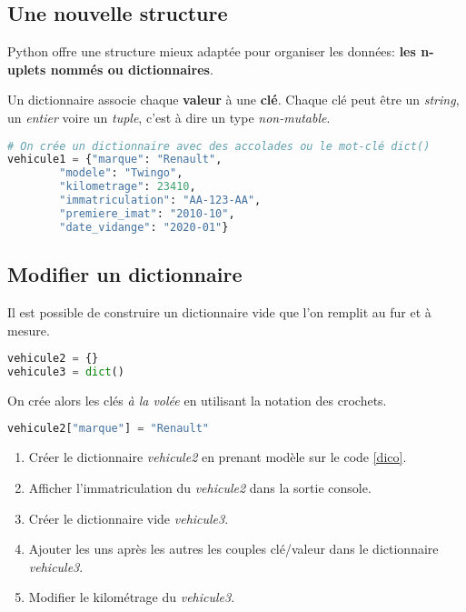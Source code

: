 \documentclass[a4paper,11pt]{article}
\begin{document}
\begin{Form}
\subsection{Une nouvelle structure}
Python offre une structure mieux adaptée pour organiser les données: \textbf{les n-uplets nommés ou dictionnaires}.
\begin{aretenir}[]
Un dictionnaire associe chaque \textbf{valeur} à une \textbf{clé}. Chaque clé peut être un \emph{string}, un \emph{entier} voire un \emph{tuple}, c'est à dire un type \emph{non-mutable}.
\end{aretenir}
\begin{center}
\begin{lstlisting}[language=Python]
# On crée un dictionnaire avec des accolades ou le mot-clé dict()
vehicule1 = {"marque": "Renault", 
		"modele": "Twingo", 
		"kilometrage": 23410, 
		"immatriculation": "AA-123-AA", 
		"premiere_imat": "2010-10", 
		"date_vidange": "2020-01"}
\end{lstlisting}
\label{dico}
\end{center}
\subsection{Modifier un dictionnaire}
Il est possible de construire un dictionnaire vide que l'on remplit au fur et à mesure.
\begin{center}
\begin{lstlisting}[language=Python]
vehicule2 = {}
vehicule3 = dict()
\end{lstlisting}
\label{moncode}
\end{center}
On crée alors les clés \emph{à la volée} en utilisant la notation des crochets.
\begin{center}
\begin{lstlisting}[language=Python]
vehicule2["marque"] = "Renault"
\end{lstlisting}
\label{moncode}
\end{center}
\begin{activite}
\begin{enumerate}
\item Créer le dictionnaire \emph{vehicule2} en prenant modèle sur le code \ref{dico}.
\item Afficher l'immatriculation du \emph{vehicule2} dans la sortie console.
\item Créer le dictionnaire vide \emph{vehicule3}.
\item Ajouter les uns après les autres les couples clé/valeur dans le dictionnaire \emph{vehicule3}.
\item Modifier le kilométrage du \emph{vehicule3}.
\end{enumerate}
\end{activite}

\end{Form}
\end{document}
